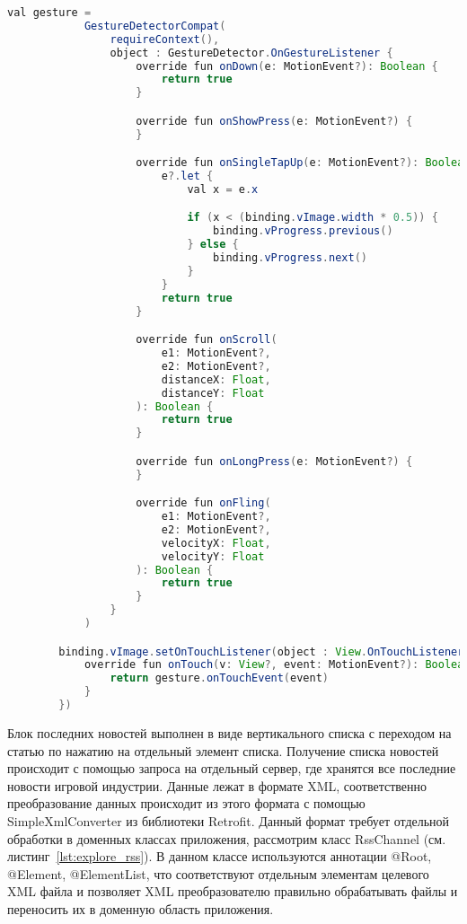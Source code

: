\begin{lstlisting}[language=Java,label={lst:explore_touch},caption={GestureDetectorCompat}]
        val gesture =
            GestureDetectorCompat(
                requireContext(),
                object : GestureDetector.OnGestureListener {
                    override fun onDown(e: MotionEvent?): Boolean {
                        return true
                    }

                    override fun onShowPress(e: MotionEvent?) {
                    }

                    override fun onSingleTapUp(e: MotionEvent?): Boolean {
                        e?.let {
                            val x = e.x

                            if (x < (binding.vImage.width * 0.5)) {
                                binding.vProgress.previous()
                            } else {
                                binding.vProgress.next()
                            }
                        }
                        return true
                    }

                    override fun onScroll(
                        e1: MotionEvent?,
                        e2: MotionEvent?,
                        distanceX: Float,
                        distanceY: Float
                    ): Boolean {
                        return true
                    }

                    override fun onLongPress(e: MotionEvent?) {
                    }

                    override fun onFling(
                        e1: MotionEvent?,
                        e2: MotionEvent?,
                        velocityX: Float,
                        velocityY: Float
                    ): Boolean {
                        return true
                    }
                }
            )

        binding.vImage.setOnTouchListener(object : View.OnTouchListener {
            override fun onTouch(v: View?, event: MotionEvent?): Boolean {
                return gesture.onTouchEvent(event)
            }
        })
\end{lstlisting}

Блок последних новостей выполнен в виде вертикального списка с переходом на статью по нажатию на отдельный элемент списка. Получение списка новостей происходит с помощью запроса на отдельный сервер, где хранятся все последние новости игровой индустрии. Данные лежат в формате XML, соответственно преобразование данных происходит из этого формата с помощью SimpleXmlConverter из библиотеки Retrofit. Данный формат требует отдельной обработки в доменных классах приложения, рассмотрим класс RssChannel (см. листинг~\ref{lst:explore_rss}). В данном классе используются аннотации @Root, @Element, @ElementList, что соответствуют отдельным элементам целевого XML файла и позволяет XML преобразователю правильно обрабатывать файлы и переносить их в доменную область приложения. 

